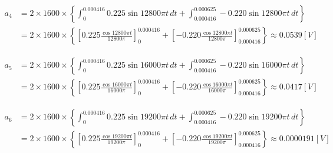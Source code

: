 \begin{screen}
  \begin{equation}
    \begin{aligned}
      a_4 &= 2\times1600\times\left\{ \int_{0}^{0.000416}0.225\sin 12800\pi t \,dt+ \int_{0.000416}^{0.000625}-0.220\sin 12800\pi t \,dt \right\}\\
      &= 2\times1600\times\left\{ \left[0.225\frac{\cos12800\pi t}{12800\pi}\right]^{0.000416}_0+ \left[-0.220\frac{\cos 12800\pi t}{12800\pi}\right]^{0.000625}_{0.000416} \right\} \approx 0.0539 \si{[V]} \label{eq18}
    \end{aligned}
  \end{equation}
\end{screen}

\begin{screen}
  \begin{equation}
    \begin{aligned}
      a_5 &= 2\times1600\times\left\{ \int_{0}^{0.000416}0.225\sin 16000\pi t \,dt+ \int_{0.000416}^{0.000625}-0.220\sin 16000\pi t \,dt \right\}\\
      &= 2\times1600\times\left\{ \left[0.225\frac{\cos16000\pi t}{16000\pi}\right]^{0.000416}_0+ \left[-0.220\frac{\cos 16000\pi t}{16000\pi}\right]^{0.000625}_{0.000416} \right\} \approx 0.0417 \si{[V]} \label{eq19}
    \end{aligned}
  \end{equation}
\end{screen}

\begin{screen}
  \begin{equation}
    \begin{aligned}
      a_6 &= 2\times1600\times\left\{ \int_{0}^{0.000416}0.225\sin 19200\pi t \,dt+ \int_{0.000416}^{0.000625}-0.220\sin 19200\pi t \,dt \right\}\\
      &= 2\times1600\times\left\{ \left[0.225\frac{\cos19200\pi t}{19200\pi}\right]^{0.000416}_0+ \left[-0.220\frac{\cos 19200\pi t}{19200\pi}\right]^{0.000625}_{0.000416} \right\} \approx 0.0000191 \si{[V]} \label{eq20}
    \end{aligned}
  \end{equation}
\end{screen}

